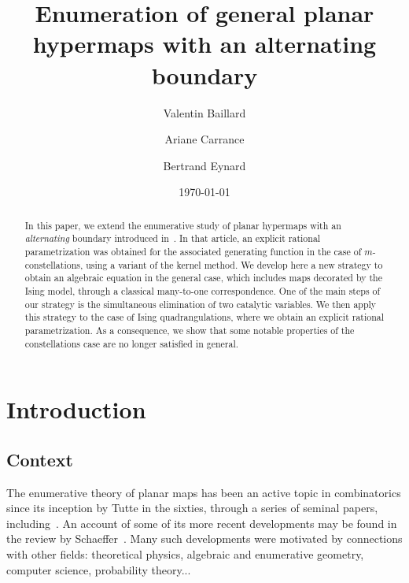 \documentclass{scrartcl}
\begin{document}
\title{Enumeration of general planar hypermaps with an alternating boundary}
\author[1,2]{Valentin Baillard}
\author[3]{Ariane Carrance}
\author[1,4]{Bertrand Eynard}


\date{\today}

\maketitle



\begin{abstract}
In this paper, we extend the enumerative study of planar hypermaps with an \emph{alternating} boundary introduced in~\cite{bouttier-carrance}. In that article, an explicit rational parametrization was obtained for the associated generating function in the case of $m$-constellations, using a variant of the kernel method. We develop here a new strategy to obtain an algebraic equation in the general case, which includes maps decorated by the Ising model, through a classical many-to-one correspondence. One of the main steps of our strategy is the simultaneous elimination of two {catalytic} variables. We then apply this strategy to the case of Ising quadrangulations, where we obtain an explicit rational parametrization. As a consequence, we show that some notable properties of the constellations case are no longer satisfied in general.
\end{abstract}


\tableofcontents


\section{Introduction}

\subsection{Context}


The enumerative theory of planar maps has been an active topic in combinatorics since its inception by Tutte in the sixties, through a series of seminal papers, including~\cite{tutte-trig,tutte-slicings,tutte-gene, tutte68}. An account of some of its more recent developments may be found in the review by Schaeffer~\cite{schaeffer-handbook}. Many such developments were motivated by connections with other fields: theoretical physics, algebraic and enumerative geometry, computer science, probability theory... 
\end{document}
